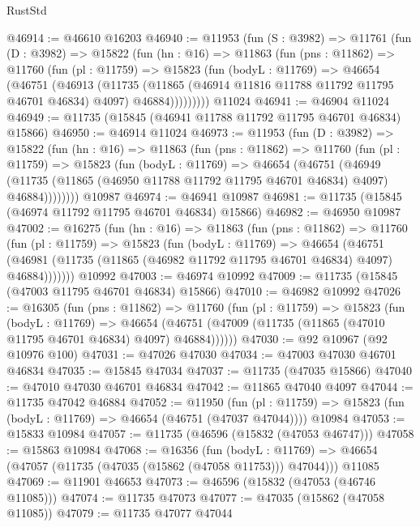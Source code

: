 \begin{lexlean}{RustStd}
\begin{coremodule}
@46914 := @46610 @16203
@46940 := @11953
    (fun (S : @3982) =>
    @11761
      (fun (D : @3982) =>
      @15822
        (fun (hn : @16) =>
        @11863
          (fun (pns : @11862) =>
          @11760
            (fun (pl : @11759) =>
            @15823
              (fun (bodyL : @11769) =>
              @46654
                (@46751
                  (@46913
                    (@11735
                      (@11865 (@46914 @11816 @11788 @11792 @11795 @46701 @46834) @4097)
                      @46884)))))))))
    @11024
@46941 := @46904 @11024
@46949 := @11735 (@15845 (@46941 @11788 @11792 @11795 @46701 @46834) @15866)
@46950 := @46914 @11024
@46973 := @11953
    (fun (D : @3982) =>
    @15822
      (fun (hn : @16) =>
      @11863
        (fun (pns : @11862) =>
        @11760
          (fun (pl : @11759) =>
          @15823
            (fun (bodyL : @11769) =>
            @46654
              (@46751
                (@46949
                  (@11735 (@11865 (@46950 @11788 @11792 @11795 @46701 @46834) @4097) @46884))))))))
    @10987
@46974 := @46941 @10987
@46981 := @11735 (@15845 (@46974 @11792 @11795 @46701 @46834) @15866)
@46982 := @46950 @10987
@47002 := @16275
    (fun (hn : @16) =>
    @11863
      (fun (pns : @11862) =>
      @11760
        (fun (pl : @11759) =>
        @15823
          (fun (bodyL : @11769) =>
          @46654
            (@46751
              (@46981 (@11735 (@11865 (@46982 @11792 @11795 @46701 @46834) @4097) @46884)))))))
    @10992
@47003 := @46974 @10992
@47009 := @11735 (@15845 (@47003 @11795 @46701 @46834) @15866)
@47010 := @46982 @10992
@47026 := @16305
    (fun (pns : @11862) =>
    @11760
      (fun (pl : @11759) =>
      @15823
        (fun (bodyL : @11769) =>
        @46654 (@46751 (@47009 (@11735 (@11865 (@47010 @11795 @46701 @46834) @4097) @46884))))))
@47030 := @92 @10967 (@92 @10976 @100)
@47031 := @47026 @47030
@47034 := @47003 @47030 @46701 @46834
@47035 := @15845 @47034
@47037 := @11735 (@47035 @15866)
@47040 := @47010 @47030 @46701 @46834
@47042 := @11865 @47040 @4097
@47044 := @11735 @47042 @46884
@47052 := @11950
    (fun (pl : @11759) => @15823 (fun (bodyL : @11769) => @46654 (@46751 (@47037 @47044))))
    @10984
@47053 := @15833 @10984
@47057 := @11735 (@46596 (@15832 (@47053 @46747)))
@47058 := @15863 @10984
@47068 := @16356
    (fun (bodyL : @11769) => @46654 (@47057 (@11735 (@47035 (@15862 (@47058 @11753))) @47044)))
    @11085
@47069 := @11901 @46653
@47073 := @46596 (@15832 (@47053 (@46746 @11085)))
@47074 := @11735 @47073
@47077 := @47035 (@15862 (@47058 @11085))
@47079 := @11735 @47077 @47044

\end{coremodule}
\end{lexlean}
